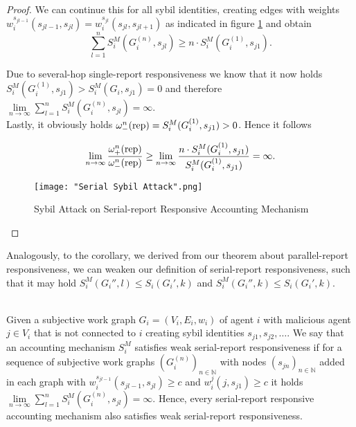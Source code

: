 \begin{proof}
\noindent{}We can continue this for all sybil identities, creating edges with weights $w_i^{s_{jl-1}}(s_{jl-1},s_{jl})=w_i^{s_{jl}}(s_{jl},s_{jl+1})$ as indicated in figure \ref{fig:Serial Sybil Attack} and obtain
\[
\sum\limits_{l=1}^{n}S^M_i(G_i^{(n)},s_{jl}) \geq n\cdot{}S^M_i(G_i^{(1)},s_{j1}).
\]

\noindent{}Due to several-hop single-report responsiveness we know that it now holds $S^M_i(G_i^{(1)},s_{j1})>S^M_i(G_i,s_{j1})=0$ and therefore $\lim\limits_{n\rightarrow\infty}\sum\limits_{l=1}^{n}S^M_i(G_i^{(n)},s_{jl})=\infty$.\vspace{1em}\\

\noindent{}Lastly, it obviously holds $\omega_{-}^n({\rm rep}) = S^M_i(G_i^{(1)},s_{j1}) > 0$. Hence it follows

\[
\lim\limits_{n\rightarrow\infty}\frac{\omega_{+}^n({\rm rep})}{\omega_{-}^n({\rm rep})}\geq\lim\limits_{n\rightarrow\infty}\frac{n\cdot{}S^M_i(G_i^{(1)},s_{j1})}{S^M_i(G_i^{(1)},s_{j1})} = \infty.
\] 

\begin{figure}[H]
\begin{center}
\texttt{[image: "Serial Sybil Attack".png]}
\caption{Sybil Attack on Serial-report Responsive Accounting Mechanism}
\label{fig:Serial Sybil Attack}
\end{center}
\end{figure}
\end{proof}

\noindent{}Analogously, to the corollary, we derived from our theorem about parallel-report responsiveness, we can weaken our definition of serial-report responsiveness, such that it may hold $S^M_i(G_i'',l)\leq{}S_i(G_i',k)$ and $S^M_i(G_i'',k)\leq{}S_i(G_i',k)$.\vspace{1em}\\

\begin{definition}\ \\
\label{def:Weak Serial-report Responsiveness}
\noindent{}Given a subjective work graph $G_i=(V_i,E_i,w_i)$ of agent $i$ with malicious agent $j\in{}V_i$ that is not connected to $i$ creating sybil identities $s_{j1},s_{j2},\ldots$. We say that an accounting mechanism $S^M_i$ satisfies weak serial-report responsiveness if for a sequence of subjective work graphs $(G_i^{(n)})_{n\in\mathbb{N}}$ with nodes $(s_{jn})_{n\in\mathbb{N}}$ added in each graph with $w_i^{s_{jl-1}}(s_{jl-1},s_{jl})\geq{}c$ and $w_i^j(j,s_{j1})\geq{}c$ it holds $\lim\limits_{n\rightarrow\infty}\sum\limits_{l=1}^{n}S^M_i(G_i^{(n)},s_{jl})=\infty$. Hence, every serial-report responsive accounting mechanism also satisfies weak serial-report responsiveness. \vspace{1em}\\
\end{definition}

